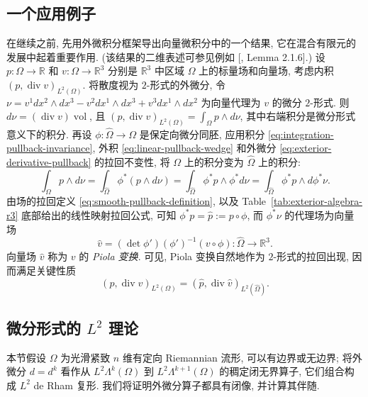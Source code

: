\subsection{{一个应用例子}}\label{subsec:piola-application}

{在继续之前, 先用外微积分框架导出向量微积分中的一个结果, 它在混合有限元的发展中起着重要作用. (该结果的二维表述可参见例如 [, Lemma 2.1.6].) 设 $p:\Omega\to\mathbb R$ 和 $v:\Omega\to\mathbb R^3$ 分别是 $\mathbb R^3$ 中区域 $\Omega$ 上的标量场和向量场, 考虑内积 $(p,\operatorname{div}v)_{L^2(\Omega)}$. 将散度视为 $2$-形式的外微分, 令 $\nu=v^1dx^2\wedge dx^3-v^2dx^1\wedge dx^3+v^3dx^1\wedge dx^2$ 为向量代理为 $v$ 的微分 $2$-形式. 则 $d\nu=(\operatorname{div}v)\operatorname{vol}$, 且 $(p,\operatorname{div}v)_{L^2(\Omega)}=\int_\Omega p\wedge d\nu$, 其中右端积分是微分形式意义下的积分. 再设 $\phi:\widehat\Omega\to\Omega$ 是保定向微分同胚, 应用积分 \eqref{eq:integration-pullback-invariance}, 外积 \eqref{eq:linear-pullback-wedge} 和外微分 \eqref{eq:exterior-derivative-pullback} 的拉回不变性, 将 $\Omega$ 上的积分变为 $\widehat\Omega$ 上的积分:}
\[
\int_\Omega p\wedge d\nu=\int_{\widehat\Omega}\phi^*(p\wedge d\nu)=\int_{\widehat\Omega}\phi^*p\wedge\phi^*d\nu=\int_{\widehat\Omega}\phi^*p\wedge d\phi^*\nu.
\]
{由场的拉回定义 \eqref{eq:smooth-pullback-definition}, 以及 Table~\ref{tab:exterior-algebra-r3} 底部给出的线性映射拉回公式, 可知 $\phi^*p=\hat p:=p\circ\phi$, 而 $\phi^*\nu$ 的代理场为向量场}
\[
\hat v=(\det\phi')(\phi')^{-1}(v\circ\phi):\widehat\Omega\to\mathbb R^3.
\]
{向量场 $\hat v$ 称为 $v$ 的 \emph{Piola 变换}. 可见, Piola 变换自然地作为 $2$-形式的拉回出现, 因而满足关键性质}
\[
(p,\operatorname{div}v)_{L^2(\Omega)}=(\hat p,\operatorname{div}\hat v)_{L^2(\widehat\Omega)}.
\]

\subsection{{微分形式的 $L^2$ 理论}}\label{subsec:differential-forms-l2-theory}

{本节假设 $\Omega$ 为光滑紧致 $n$ 维有定向 Riemannian 流形, 可以有边界或无边界; 将外微分 $d=d^k$ 看作从 $L^2\Lambda^k(\Omega)$ 到 $L^2\Lambda^{k+1}(\Omega)$ 的稠定闭无界算子, 它们组合构成 $L^2$ de Rham 复形. 我们将证明外微分算子都具有闭像, 并计算其伴随.}

